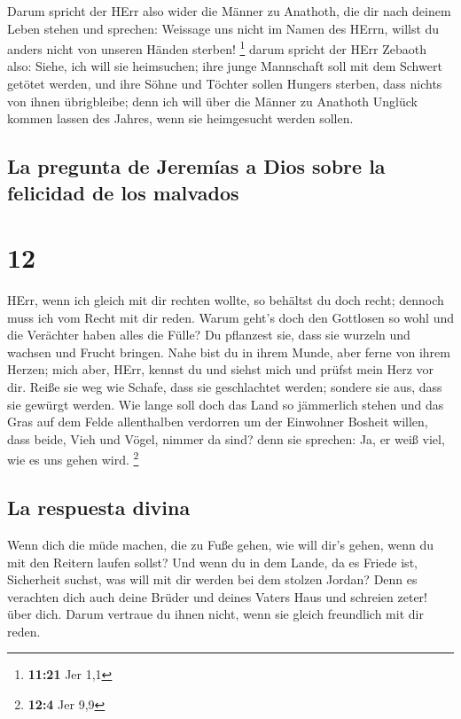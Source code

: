  Darum spricht der HErr also wider die Männer zu
Anathoth, die dir nach deinem Leben stehen und sprechen: Weissage uns
nicht im Namen des HErrn, willst du anders nicht von unseren Händen
sterben! \footnote{\textbf{11:21} Jer 1,1}  darum spricht
der HErr Zebaoth also: Siehe, ich will sie heimsuchen; ihre junge
Mannschaft soll mit dem Schwert getötet werden, und ihre Söhne und
Töchter sollen Hungers sterben, dass nichts von ihnen übrigbleibe;
 denn ich will über die Männer zu Anathoth Unglück kommen
lassen des Jahres, wenn sie heimgesucht werden sollen.

\hypertarget{la-pregunta-de-jeremuxedas-a-dios-sobre-la-felicidad-de-los-malvados}{%
\subsection{La pregunta de Jeremías a Dios sobre la felicidad de los
malvados}\label{la-pregunta-de-jeremuxedas-a-dios-sobre-la-felicidad-de-los-malvados}}

\hypertarget{section-11}{%
\section{12}\label{section-11}}

 HErr, wenn ich gleich mit dir rechten wollte, so behältst
du doch recht; dennoch muss ich vom Recht mit dir reden. Warum geht's
doch den Gottlosen so wohl und die Verächter haben alles die Fülle?
 Du pflanzest sie, dass sie wurzeln und wachsen und Frucht
bringen. Nahe bist du in ihrem Munde, aber ferne von ihrem Herzen;
 mich aber, HErr, kennst du und siehst mich und prüfst
mein Herz vor dir. Reiße sie weg wie Schafe, dass sie geschlachtet
werden; sondere sie aus, dass sie gewürgt werden.  Wie
lange soll doch das Land so jämmerlich stehen und das Gras auf dem Felde
allenthalben verdorren um der Einwohner Bosheit willen, dass beide, Vieh
und Vögel, nimmer da sind? denn sie sprechen: Ja, er weiß viel, wie es
uns gehen wird. \footnote{\textbf{12:4} Jer 9,9}

\hypertarget{la-respuesta-divina}{%
\subsection{La respuesta divina}\label{la-respuesta-divina}}

 Wenn dich die müde machen, die zu Fuße gehen, wie will
dir's gehen, wenn du mit den Reitern laufen sollst? Und wenn du in dem
Lande, da es Friede ist, Sicherheit suchst, was will mit dir werden bei
dem stolzen Jordan?  Denn es verachten dich auch deine
Brüder und deines Vaters Haus und schreien zeter! über dich. Darum
vertraue du ihnen nicht, wenn sie gleich freundlich mit dir reden.

